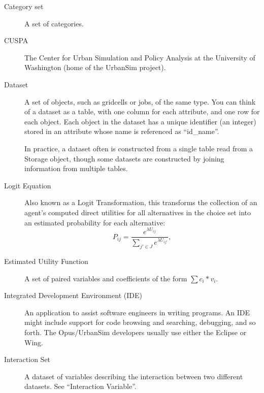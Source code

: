 \begin{description}
\item[Category set] 
A set of categories.

\item[CUSPA]  
The Center for Urban Simulation and Policy Analysis at the University of Washington
(home of the UrbanSim project).

\item[Dataset]
A set of objects, such as gridcells or jobs, of the same type.
You can think of a dataset as a table, with one column
for each attribute, and one row for each object.  
Each object in the dataset has a unique identifier (an integer) stored in
an attribute whose name is referenced as ``id_name''.  

In practice, a dataset often is constructed from a single
table read from a Storage object, though some datasets 
are constructed by joining information from multiple tables.

\item[Logit Equation] 
Also known as a Logit Transformation, this transforms the
collection of an agent's computed direct utilities for all
alternatives in the choice set into an estimated probability for
each alternative:
\begin{equation}
    P_{ij}=\frac{e^{\lambda U_{ij}}}{\sum_{j' \in J}e^{\lambda
    U_{ij'}}},
\end{equation}

\item[Estimated Utility Function] 
A set of paired variables and coefficients of the form $\sum
c_{i}*v_{i}$.

\item[Integrated Development Environment (IDE)]
An application to assist software engineers in writing programs.  An IDE might 
include support for code browsing and searching, debugging, and so forth.
The Opus/UrbanSim developers usually use either the 
Eclipse or 
Wing\@.

\item[Interaction Set] 
A dataset of variables describing the interaction between two
different datasets.  See ``Interaction Variable''.


\end{description}
